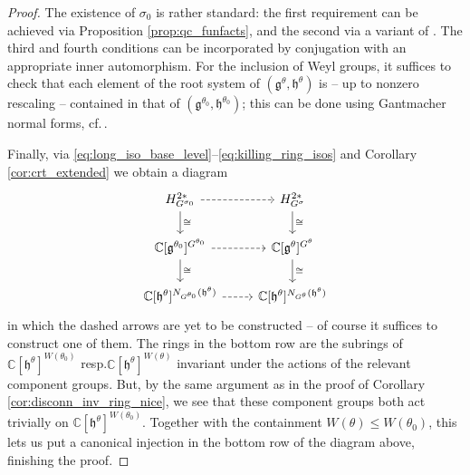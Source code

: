 \documentclass{amsart}
\newcommand{\cf}{cf.\,}
\newcommand{\C}{\mathbb{C}}
\newcommand{\g}{\mathfrak{g}}
\newcommand{\h}{\mathfrak{h}}
\theoremstyle{definition}
\theoremstyle{plain}
\theoremstyle{remark}
\begin{document}
\begin{proof}
    The existence of $\sigma_0$ is rather standard: the first requirement can be achieved via Proposition \ref{prop:qc_funfacts}, and the second via a variant of \cite[Prop.\,3.7]{Onishchik2004_real}. The third and fourth conditions can be incorporated by conjugation with an appropriate inner automorphism. For the inclusion of Weyl groups, it suffices to check that each element of the root system of $(\g^\theta, \h^\theta)$ is -- up to nonzero rescaling -- contained in that of $(\g^{\theta_0}, \h^{\theta_0})$; this can be done using Gantmacher normal forms, \cf \cite[Thm.\,4.2]{Onishchik2004_real}. 
    
    Finally, via \eqref{eq:long_iso_base_level}--\eqref{eq:killing_ring_isos} and Corollary \ref{cor:crt_extended} we obtain a diagram
    $$
    \begin{tikzcd}
        H^{2*}_{G^{\sigma_0}}
            \arrow[d, "\cong"]
            \arrow[r, dashrightarrow]
        & H^{2*}_{G^\sigma}
            \arrow[d, "\cong"] \\
        \C[\g^{\theta_0}]^{G^{\theta_0}}
            \arrow[r, dashrightarrow]
            \arrow[d, "\cong"]
        & \C[\g^{\theta}]^{G^{\theta}}
            \arrow[d, "\cong"] \\
        \C[\h^\theta]^{N_{G^{\theta_0}}(\h^\theta)}
           \arrow[r, dashrightarrow]
        & \C[\h^\theta]^{N_{G^{\theta}}(\h^\theta)}
    \end{tikzcd}
    $$
    in which the dashed arrows are yet to be constructed -- of course it suffices to construct one of them. The rings in the bottom row are the subrings of $\C[\h^\theta]^{W(\theta_0)}$ resp.\;$\C[\h^\theta]^{W(\theta)}$ invariant under the actions of the relevant component groups. But, by the same argument as in the proof of Corollary \ref{cor:disconn_inv_ring_nice}, we see that these component groups both act trivially on $\C[\h^\theta]^{W(\theta_0)}$. Together with the containment $W(\theta)\le W(\theta_0)$, this lets us put a canonical injection in the bottom row of the diagram above, finishing the proof. 
\end{proof}
\end{document}
